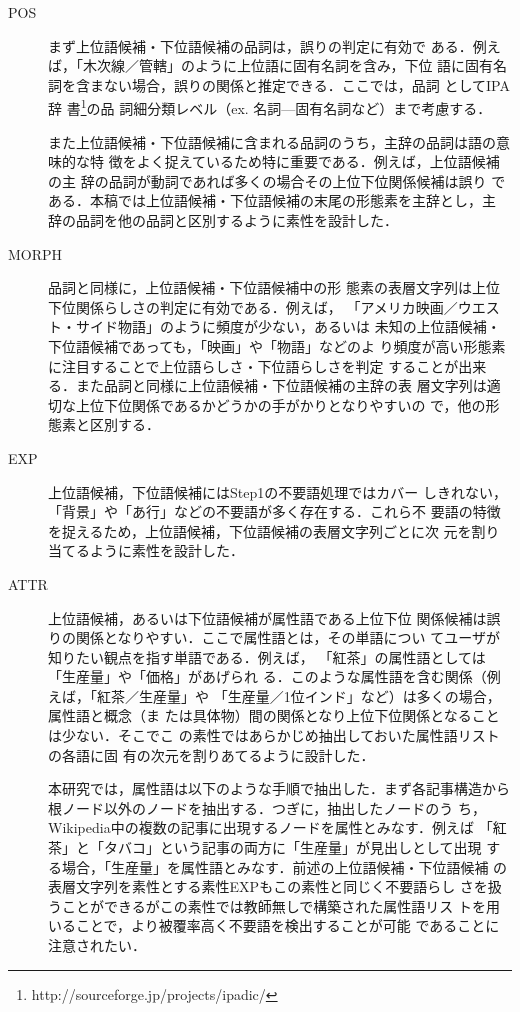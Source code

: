 \documentclass[japanese]{jnlp_1.4}
\begin{document}
\begin{description}
      \item[POS] まず上位語候補・下位語候補の品詞は，誤りの判定に有効で
    ある．例えば，「木次線／管轄」のように上位語に固有名詞を含み，下位
    語に固有名詞を含まない場合，誤りの関係と推定できる．ここでは，品詞
    として{IPA辞
      書}\footnote{http://sourceforge.jp/projects/ipadic/}{の}品
    詞細分類レベル（ex. 名詞—固有名詞など）まで考慮する．

    また上位語候補・下位語候補に含まれる品詞のうち，主辞の品詞は語の意味的な特
    徴をよく捉えているため特に重要である．例えば，上位語候補の主
    辞の品詞が動詞であれば多くの場合その上位下位関係候補は誤り
    である．本稿では上位語候補・下位語候補の末尾の形態素を主辞とし，主
    辞の品詞を他の品詞と区別するように素性を設計した．

      \item[MORPH] {品詞と同様に}，上位語候補・下位語候補中の形
    態素の表層文字列は上位下位関係らしさの判定に有効である．例えば，
    「アメリカ映画／ウエスト・サイド物語」のように頻度が少ない，あるいは
    未知の上位語候補・下位語候補であっても，「映画」や「物語」などのよ
    り頻度が高い形態素に注目することで上位語らしさ・下位語らしさを判定
    することが出来る．また品詞と同様に上位語候補・下位語候補の主辞の表
    層文字列は適切な上位下位関係であるかどうかの手がかりとなりやすいの
    で，他の形態素と区別する．

      \item[EXP] 上位語候補，下位語候補にはStep1の不要語処理ではカバー
    しきれない，「背景」や「あ行」などの不要語が多く存在する．これら不
    要語の特徴を捉えるため，上位語候補，下位語候補の表層文字列ごとに次
    元を割り当てるように素性を設計した．

      \item[ATTR] 上位語候補，あるいは下位語候補が属性語である上位下位
    関係候補は誤りの関係となりやすい．ここで属性語とは，その単語につい
    てユーザが知りたい観点を指す単語である\cite{JTokunaga_2006}．例えば，
    「紅茶」の属性語としては「生産量」や「価格」があげられ
    る．{このような属性語を含む関係（例えば，}「紅茶／生産量」や
    「生産量／1位インド」など）{は多くの場合，}属性語と概念（ま
    たは具体物）間の関係となり上位下位関係となることは少ない．そこでこ
    の素性ではあらかじめ抽出しておいた{属性語リストの各語に固
      有の次元を割りあてるように設計した．}

    本研究では，属性語は以下のような手順で抽出した．まず各記事構造から
    根ノード以外のノードを抽出する．つぎに，抽出したノードのう
    ち，Wikipedia中の複数の記事に出現するノードを属性とみなす．例えば
    「紅茶」と「タバコ」という記事の両方に「生産量」が見出しとして出現
    する場合，「生産量」を属性語とみなす．前述の上位語候補・下位語候補
    の表層文字列を素性とする素性EXPもこの素性と同{じく不要語らし
      さ}を扱うことができるがこの素性では教師無しで構築された属性語リス
    トを用いることで，より被覆率高く{不要語}を検出することが可能
    であることに注意されたい．


\end{description}
\end{document}
